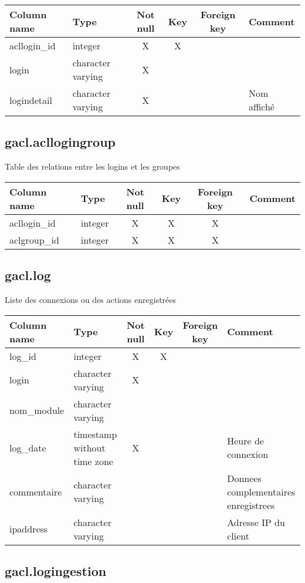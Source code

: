 \begin{tabular}{|l| p{2cm}|c|c|c| p{3cm}|}
\hline
Column name & Type & Not null & Key & Foreign key & Comment \\
\hline
acllogin\_id & integer & X & X & & \\
\hline
login & character varying & X & & & \\
\hline
logindetail & character varying & X & & & Nom affiché\\
\hline
\end{tabular}
\subsection{gacl.acllogingroup}
Table des relations entre les logins et les groupes

\begin{tabular}{|l| p{2cm}|c|c|c| p{3cm}|}
\hline
Column name & Type & Not null & Key & Foreign key & Comment \\
\hline
acllogin\_id & integer & X & X & X & \\
\hline
aclgroup\_id & integer & X & X & X & \\
\hline
\end{tabular}
\subsection{gacl.log}
Liste des connexions ou des actions enregistrées

\begin{tabular}{|l| p{2cm}|c|c|c| p{3cm}|}
\hline
Column name & Type & Not null & Key & Foreign key & Comment \\
\hline
log\_id & integer & X & X & & \\
\hline
login & character varying & X & & & \\
\hline
nom\_module & character varying & & & & \\
\hline
log\_date & timestamp without time zone & X & & & Heure de connexion\\
\hline
commentaire & character varying & & & & Donnees complementaires enregistrees\\
\hline
ipaddress & character varying & & & & Adresse IP du client\\
\hline
\end{tabular}
\subsection{gacl.logingestion}


